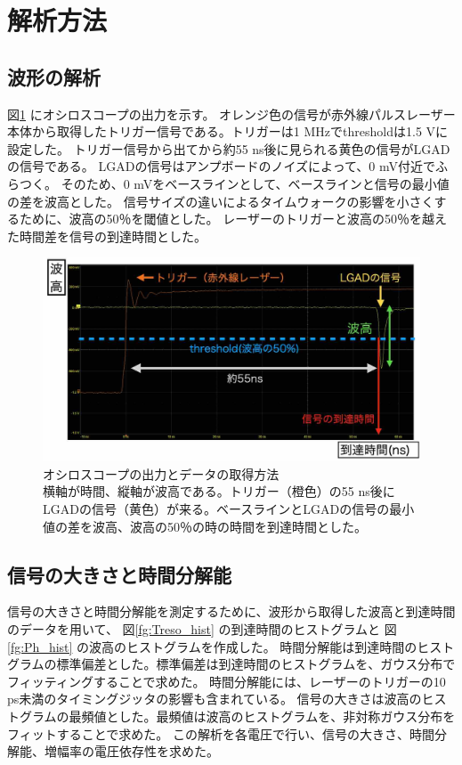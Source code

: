\section{解析方法}
\subsection{波形の解析}
図\ref{fg:Lecroy_output} にオシロスコープの出力を示す。
オレンジ色の信号が赤外線パルスレーザー本体から取得したトリガー信号である。トリガーは1 MHzでthresholdは1.5 Vに設定した。
トリガー信号から出てから約55 ns後に見られる黄色の信号がLGADの信号である。
LGADの信号はアンプボードのノイズによって、0 mV付近でふらつく。
そのため、0 mVをベースラインとして、ベースラインと信号の最小値の差を波高とした。
信号サイズの違いによるタイムウォークの影響を小さくするために、波高の50％を閾値とした。
レーザーのトリガーと波高の50％を越えた時間差を信号の到達時間とした。

\begin{figure}[h]
    \centering
    \includegraphics[width=15cm]{fig/ch4/Lecroy_output.jpg}
    \caption[オシロスコープの出力とデータの取得方法]{オシロスコープの出力とデータの取得方法\\横軸が時間、縦軸が波高である。トリガー（橙色）の55 ns後にLGADの信号（黄色）が来る。ベースラインとLGADの信号の最小値の差を波高、波高の50％の時の時間を到達時間とした。}
    \label{fg:Lecroy_output}
\end{figure}

\subsection{信号の大きさと時間分解能}
信号の大きさと時間分解能を測定するために、波形から取得した波高と到達時間のデータを用いて、
図\ref{fg:Treso_hist} の到達時間のヒストグラムと
図\ref{fg:Ph_hist} の波高のヒストグラムを作成した。
時間分解能は到達時間のヒストグラムの標準偏差とした。標準偏差は到達時間のヒストグラムを、ガウス分布でフィッティングすることで求めた。
時間分解能には、レーザーのトリガーの10 ps未満のタイミングジッタの影響も含まれている。
信号の大きさは波高のヒストグラムの最頻値とした。最頻値は波高のヒストグラムを、非対称ガウス分布をフィットすることで求めた。
この解析を各電圧で行い、信号の大きさ、時間分解能、増幅率の電圧依存性を求めた。

